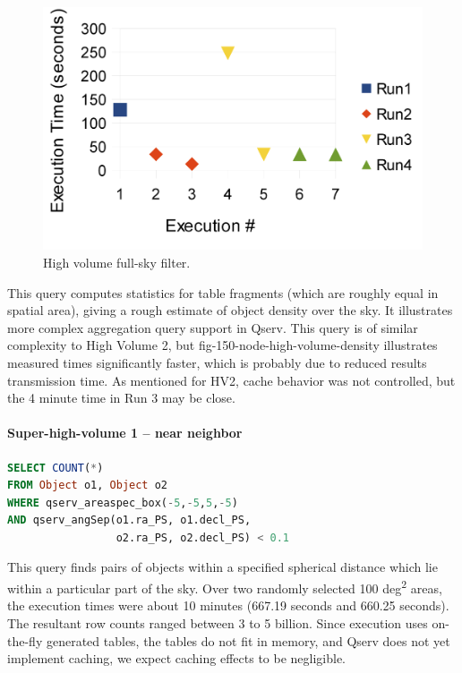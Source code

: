 \documentclass[DM,lsstdraft,toc]{lsstdoc}
\begin{document}
\begin{figure}[H]
\centering
\includegraphics{_static/150_node_high_volume_density.png}
\caption{High volume full-sky filter.}
\end{figure}

This query computes statistics for table fragments (which are roughly
equal in spatial area), giving a rough estimate of object density over
the sky. It illustrates more complex aggregation query support in Qserv.
This query is of similar complexity to High Volume 2, but
fig-150-node-high-volume-density illustrates measured times
significantly faster, which is probably due to reduced results
transmission time. As mentioned for HV2, cache behavior was not
controlled, but the 4 minute time in Run 3 may be close.

\paragraph{Super-high-volume 1 -- near
neighbor}\label{super-high-volume-1-near-neighbor}

\begin{lstlisting}[language=SQL]
SELECT COUNT(*)
FROM Object o1, Object o2
WHERE qserv_areaspec_box(-5,-5,5,-5)
AND qserv_angSep(o1.ra_PS, o1.decl_PS,
                 o2.ra_PS, o2.decl_PS) < 0.1
\end{lstlisting}

This query finds pairs of objects within a specified spherical distance
which lie within a particular part of the sky. Over two randomly
selected 100 deg\textsuperscript{2} areas, the execution times were
about 10 minutes (667.19 seconds and 660.25 seconds). The resultant row
counts ranged between 3 to 5 billion. Since execution uses on-the-fly
generated tables, the tables do not fit in memory, and Qserv does not
yet implement caching, we expect caching effects to be negligible.
\end{document}
